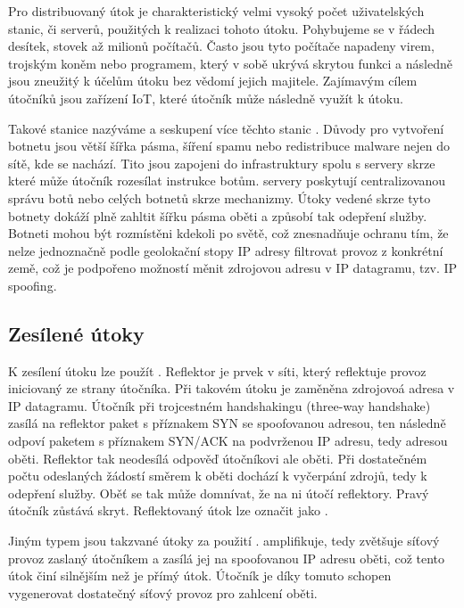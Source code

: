 Pro distribuovaný  útok je charakteristický velmi vysoký počet uživatelských stanic,
či serverů, použitých k realizaci tohoto útoku. Pohybujeme se v řádech desítek, stovek až
milionů počítačů. 
Často jsou tyto počítače napadeny virem, trojským koněm nebo programem, který v sobě ukrývá
skrytou funkci a následně jsou zneužitý k účelům  útoku bez vědomí jejich majitele.
Zajímavým cílem útočníků jsou zařízení IoT, které útočník může následně využít k 
útoku.

Takové stanice nazýváme  a seskupení více těchto stanic . Důvody pro
vytvoření botnetu jsou větší šířka pásma, šíření spamu nebo redistribuce malware nejen do sítě,
kde se  nachází. Tito  jsou zapojeni do  infrastruktury spolu
s  servery skrze které může útočník rozesílat instrukce botům. %
 servery poskytují centralizovanou správu botů nebo celých botnetů skrze 
mechanizmy.
Útoky vedené skrze tyto botnety dokáží plně zahltit šířku pásma oběti a způsobí tak odepření služby. 
Botneti mohou být rozmístěni kdekoli po světě, což znesnadňuje ochranu tím, že nelze jednoznačně podle geolokační stopy IP adresy filtrovat provoz z konkrétní země, což je podpořeno možností měnit zdrojovou adresu v IP datagramu, tzv. IP spoofing.

\subsection{Zesílené útoky}
K zesílení útoku lze použít . Reflektor je prvek v síti, který reflektuje provoz
iniciovaný ze strany útočníka. Při takovém útoku je  zaměněna zdrojovoá adresa v
IP datagramu. Útočník při trojcestném handshakingu (three-way handshake) zasílá na reflektor
paket s příznakem SYN se spoofovanou adresou, ten následně odpoví paketem s příznakem SYN/ACK
na podvrženou IP adresu, tedy adresou oběti. Reflektor tak neodesílá odpověď útočníkovi ale
oběti. Při dostatečném počtu odeslaných žádostí směrem k oběti dochází k vyčerpání zdrojů, tedy
k odepření služby. Oběť se tak může domnívat, že na ni útočí reflektory. Pravý útočník zůstává
skryt. Reflektovaný útok lze označit jako .

Jiným typem jsou takzvané  útoky za použití .
 amplifikuje, tedy zvětšuje síťový provoz zaslaný útočníkem a zasílá jej na
spoofovanou IP adresu oběti, což tento útok činí silnějším než je přímý útok. Útočník je díky
tomuto schopen vygenerovat dostatečný síťový provoz pro zahlcení oběti.

